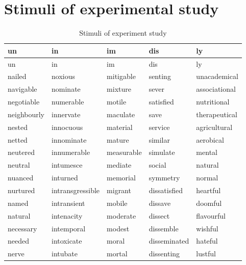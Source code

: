 \chapter{Stimuli of experimental study} \label{Appendix E: Stimuli of Experimental Study}
{\small\begin{longtabu} to \textwidth {XXXXX}
\caption{Stimuli of experiment study\label{Stimuli of Experiment Study}}\\
\lsptoprule un    & {in}      & {im}     & {dis}   & {ly}     \\\midrule\endfirsthead
\midrule un    & {in}      & {im}     & {dis}   & {ly}     \\\midrule\endhead
\endfoot\lspbottomrule\endlastfoot
	nailed        & noxious          & mitigable       & senting        & unacademical    \\
	navigable     & nominate         & mixture         & sever          & associational   \\
	negotiable    & numerable        & motile          & satisfied      & nutritional     \\
	neighbourly   & innervate        & maculate        & save           & therapeutical   \\
	nested        & innocuous        & material        & service        & agricultural    \\
					netted        & innominate       & mature          & similar        & aerobical       \\
					neutered      & innumerable      & measurable      & simulate       & mental          \\
	neutral       & intumesce        & mediate         & social         & natural         \\
	nuanced       & inturned         & memorial        & symmetry       & normal          \\		
				nurtured      & intransgressible & migrant         & dissatisfied   & heartful        \\
				named         & intransient      & mobile          & dissave        & doomful         \\
				natural       & intenacity       & moderate        & dissect        & flavourful      \\
				necessary     & intemporal       & modest          & dissemble      & wishful         \\
				needed        & intoxicate       & moral           & disseminated   & hateful         \\
				nerve         & intubate         & mortal          & dissenting     & lustful         \\

\end{longtabu}}
